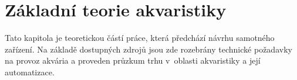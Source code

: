 \chapter{Základní teorie akvaristiky}
    Tato kapitola je teoretickou částí práce, která předchází návrhu samotného zařízení. Na základě dostupných zdrojů jsou zde rozebrány technické požadavky na provoz akvária a proveden průzkum trhu v~oblasti akvaristiky a její automatizace.  











